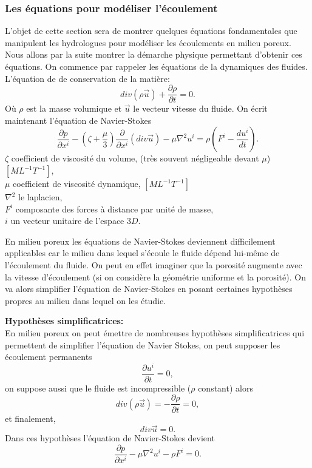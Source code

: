 \documentclass[a4paper,11pt]{article}
\numberwithin{equation}{section}
\begin{document}
\subsubsection{Les équations pour modéliser l'écoulement}
\label{ch: eq meca-flu}
L'objet de cette section sera de montrer quelques équations fondamentales que manipulent les hydrologues pour modéliser les écoulements en milieu poreux. Nous allons par la suite montrer la démarche physique permettant d'obtenir ces équations. On commence par rappeler les équations de la dynamiques des fluides. L'équation de de conservation de la matière:
\begin{equation}
	\label{cons-mat}
	div(\rho \overrightarrow{u})+\frac{\partial \rho}{\partial t}=0.
\end{equation}
Où $\rho$ est la masse volumique et $\overrightarrow{u}$ le vecteur vitesse du fluide. On écrit maintenant l'équation de Navier-Stokes
\begin{equation}
	\frac{\partial p}{\partial x^i}-(\zeta+\frac{\mu}{3})\frac{\partial}{\partial x^i}(div\overrightarrow{u}) - \mu \nabla^2u^i=\rho(F^i -\frac{du^i}{dt}).
\end{equation}
$\zeta$ coefficient de viscosité du volume, (très souvent négligeable devant $\mu$) $[ML^{-1}T^{-1}]$,\\
$\mu$ coefficient de viscosité dynamique, $[ML^{-1}T^{-1}]$\\
$\nabla^2$ le laplacien,\\
$F^i$ composante des forces à distance par unité de masse,\\
$i$ un vecteur unitaire de l'espace $3D$.

En milieu poreux les équations de Navier-Stokes deviennent difficilement applicables car le milieu dans lequel s'écoule le fluide dépend lui-même de l'écoulement du fluide. On peut en effet imaginer que la porosité augmente avec la vitesse d'écoulement (si on considère la géométrie uniforme et la porosité). On va alors simplifier l'équation de Navier-Stokes en posant certaines hypothèses propres au milieu dans lequel on les étudie. 

\vspace{0.7cm}

\noindent \textbf{Hypothèses simplificatrices:}\\
En milieu poreux on peut émettre de nombreuses hypothèses simplificatrices qui permettent de simplifier l'équation de Navier Stokes, on peut supposer les écoulement permanents
\[\frac{\partial u^i}{\partial t}=0,\]
on suppose aussi que le fluide est incompressible ($\rho$ constant) alors
\[div(\rho \overrightarrow{u})=-\frac{\partial \rho}{\partial t}=0,\]
et finalement,
\[div \overrightarrow{u}=0.\]
Dans ces hypothèses l'équation de Navier-Stokes devient
\begin{equation}
	\label{eq-cons-m-simp}
	\frac{\partial p}{\partial x^i}-\mu \nabla^2u^i-\rho F^i=0. 
\end{equation}
\end{document}
